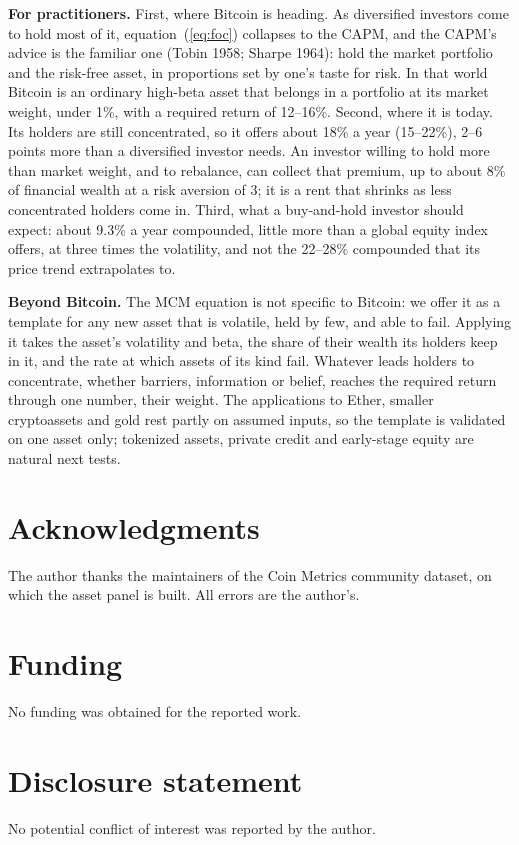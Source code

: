 \documentclass[11pt]{article}
\begin{document}
\textbf{For practitioners.} First, where Bitcoin is heading. As diversified investors come to hold most of it, equation~(\ref{eq:foc}) collapses to the CAPM, and the CAPM's advice is the familiar one (Tobin 1958; Sharpe 1964): hold the market portfolio and the risk-free asset, in proportions set by one's taste for risk. In that world Bitcoin is an ordinary high-beta asset that belongs in a portfolio at its market weight, under 1\%, with a required return of 12--16\%. Second, where it is today. Its holders are still concentrated, so it offers about 18\% a year (15--22\%), 2--6 points more than a diversified investor needs. An investor willing to hold more than market weight, and to rebalance, can collect that premium, up to about 8\% of financial wealth at a risk aversion of 3; it is a rent that shrinks as less concentrated holders come in. Third, what a buy-and-hold investor should expect: about 9.3\% a year compounded, little more than a global equity index offers, at three times the volatility, and not the 22--28\% compounded that its price trend extrapolates to.

\textbf{Beyond Bitcoin.} The MCM equation is not specific to Bitcoin: we offer it as a template for any new asset that is volatile, held by few, and able to fail. Applying it takes the asset's volatility and beta, the share of their wealth its holders keep in it, and the rate at which assets of its kind fail. Whatever leads holders to concentrate, whether barriers, information or belief, reaches the required return through one number, their weight. The applications to Ether, smaller cryptoassets and gold rest partly on assumed inputs, so the template is validated on one asset only; tokenized assets, private credit and early-stage equity are natural next tests.

\section*{Acknowledgments}
\noindent The author thanks the maintainers of the Coin Metrics community dataset, on which the asset panel is built. All errors are the author's.

\section*{Funding}
\noindent No funding was obtained for the reported work.

\section*{Disclosure statement}
\noindent No potential conflict of interest was reported by the author.
\end{document}
